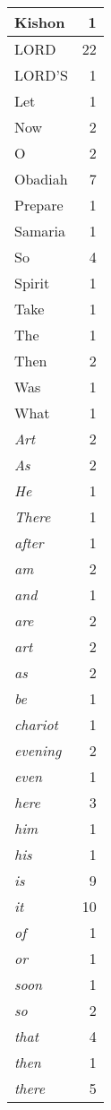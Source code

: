 \begin{center}
\begin{longtable}{l|r}
Kishon & 1\\ \hline 
LORD & 22\\ \hline 
LORD'S & 1\\ \hline 
Let & 1\\ \hline 
Now & 2\\ \hline 
O & 2\\ \hline 
Obadiah & 7\\ \hline 
Prepare & 1\\ \hline 
Samaria & 1\\ \hline 
So & 4\\ \hline 
Spirit & 1\\ \hline 
Take & 1\\ \hline 
The & 1\\ \hline 
Then & 2\\ \hline 
Was & 1\\ \hline 
What & 1\\ \hline 
\emph{Art} & 2\\ \hline 
\emph{As} & 2\\ \hline 
\emph{He} & 1\\ \hline 
\emph{There} & 1\\ \hline 
\emph{after} & 1\\ \hline 
\emph{am} & 2\\ \hline 
\emph{and} & 1\\ \hline 
\emph{are} & 2\\ \hline 
\emph{art} & 2\\ \hline 
\emph{as} & 2\\ \hline 
\emph{be} & 1\\ \hline 
\emph{chariot} & 1\\ \hline 
\emph{evening} & 2\\ \hline 
\emph{even} & 1\\ \hline 
\emph{here} & 3\\ \hline 
\emph{him} & 1\\ \hline 
\emph{his} & 1\\ \hline 
\emph{is} & 9\\ \hline 
\emph{it} & 10\\ \hline 
\emph{of} & 1\\ \hline 
\emph{or} & 1\\ \hline 
\emph{soon} & 1\\ \hline 
\emph{so} & 2\\ \hline 
\emph{that} & 4\\ \hline 
\emph{then} & 1\\ \hline 
\emph{there} & 5\\ \hline 

\end{longtable}
\end{center}
